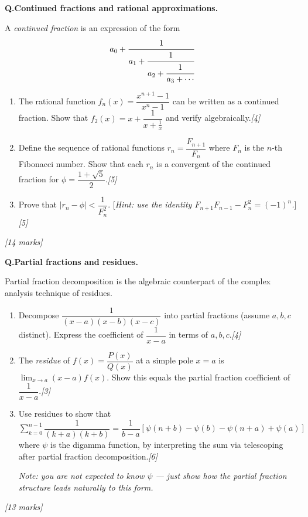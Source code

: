 \documentclass[12pt,a4paper]{article}
\theoremstyle{defstyle}
\newcounter{qnum}
\newcommand{\Q}[1]{\stepcounter{qnum}\medskip\noindent\textbf{Q\theqnum.}\quad #1\par}
\newcommand{\mks}[1]{\hfill\textit{[#1 marks]}}
\newcommand{\ds}{\displaystyle}
\begin{document}
\begin{tcolorbox}[explore, title={\color{explorecol}\bfseries Exploration (Beyond Syllabus)}]

\Q{\textbf{Continued fractions and rational approximations.}

A \emph{continued fraction} is an expression of the form
\[
  a_0 + \cfrac{1}{a_1 + \cfrac{1}{a_2 + \cfrac{1}{a_3 + \cdots}}}
\]
\begin{enumerate}[label=(\alph*),itemsep=4pt]
  \item The rational function \(f_n(x) = \dfrac{x^{n+1}-1}{x^n-1}\) can be written as a continued fraction.
        Show that \(f_2(x)=x+\dfrac{1}{x+\frac{1}{x}}\) and verify algebraically.\hfill\textit{[4]}
  \item Define the sequence of rational functions \(r_n = \dfrac{F_{n+1}}{F_n}\) where \(F_n\) is the \(n\)-th Fibonacci number.
        Show that each \(r_n\) is a convergent of the continued fraction for \(\phi = \dfrac{1+\sqrt{5}}{2}\).\hfill\textit{[5]}
  \item Prove that \(|r_n - \phi| < \dfrac{1}{F_n^2}\). [\textit{Hint: use the identity \(F_{n+1}F_{n-1}-F_n^2=(-1)^n\).}]\hfill\textit{[5]}
\end{enumerate}\mks{14}}

\Q{\textbf{Partial fractions and residues.}

Partial fraction decomposition is the algebraic counterpart of the complex analysis technique of residues.

\begin{enumerate}[label=(\alph*),itemsep=4pt]
  \item Decompose \(\dfrac{1}{(x-a)(x-b)(x-c)}\) into partial fractions (assume \(a,b,c\) distinct).  
        Express the coefficient of \(\dfrac{1}{x-a}\) in terms of \(a,b,c\).\hfill\textit{[4]}
  \item The \emph{residue} of \(f(x)=\dfrac{P(x)}{Q(x)}\) at a simple pole \(x=a\) is \(\lim_{x\to a}(x-a)f(x)\).
        Show this equals the partial fraction coefficient of \(\dfrac{1}{x-a}\).\hfill\textit{[3]}
  \item Use residues to show that
        \(\ds\sum_{k=0}^{n-1}\dfrac{1}{(k+a)(k+b)} = \dfrac{1}{b-a}\left[\psi(n+b)-\psi(b)-\psi(n+a)+\psi(a)\right]\)
        where \(\psi\) is the digamma function, by interpreting the sum via telescoping after partial fraction decomposition.\hfill\textit{[6]}

  \textit{Note: you are not expected to know \(\psi\) --- just show how the partial fraction structure leads naturally to this form.}
\end{enumerate}\mks{13}}

\end{tcolorbox}
\end{document}
